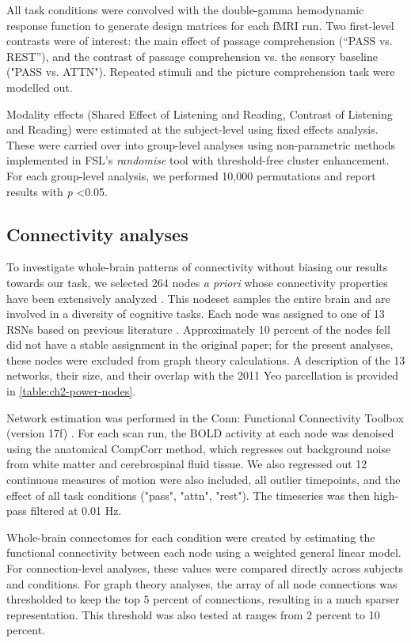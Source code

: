 All task conditions were convolved with the double-gamma hemodynamic response function to generate design matrices for each fMRI run. Two first-level contrasts were of interest: the main effect of passage comprehension (“PASS vs. REST”), and the contrast of passage comprehension vs. the sensory baseline ("PASS vs. ATTN"). Repeated stimuli and the picture comprehension task were modelled out.

Modality effects (Shared Effect of Listening and Reading, Contrast of Listening and Reading) were estimated at the subject-level using fixed effects analysis. These were carried over into group-level analyses using non-parametric methods implemented in FSL’s \textit{randomise} tool with threshold-free cluster enhancement. For each group-level analysis, we performed 10,000 permutations and report results with \textit{p} \textless 0.05. 

\subsection{Connectivity analyses}

To investigate whole-brain patterns of connectivity without biasing our results towards our task, we selected 264 nodes \textit{a priori} whose connectivity properties have been extensively analyzed \citep{Power2011}. This nodeset samples the entire brain and are involved in a diversity of cognitive tasks. Each node was assigned to one of 13 RSNs based on previous literature \citep{Power2013}. Approximately 10 percent of the nodes fell did not have a stable assignment in the original paper; for the present analyses, these nodes were excluded from graph theory calculations. A description of the 13 networks, their size, and their overlap with the 2011 Yeo parcellation is provided in \ref{table:ch2-power-nodes}. 

Network estimation was performed in the Conn: Functional Connectivity Toolbox (version 17f) \citep{Nieto-castanon}. For each scan run, the BOLD activity at each node was denoised using the anatomical CompCorr method, which regresses out background noise from white matter and cerebrospinal fluid tissue. We also regressed out 12 continuous measures of motion were also included, all outlier timepoints, and the effect of all task conditions ("pass", "attn", "rest"). The timeseries was then high-pass filtered at 0.01 Hz.

Whole-brain connectomes for each condition were created by estimating the functional connectivity between each node using a weighted general linear model. For connection-level analyses, these values were compared directly across subjects and conditions. For graph theory analyses, the array of all node connections was thresholded to keep the top 5 percent of connections, resulting in a much sparser representation. This threshold was also tested at ranges from 2 percent to 10 percent.

